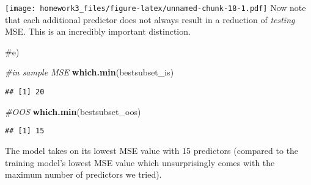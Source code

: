 \documentclass[
]{article}
\newenvironment{Shaded}{\begin{snugshade}}{\end{snugshade}}
\newcommand{\CommentTok}[1]{\textcolor[rgb]{0.56,0.35,0.01}{\textit{#1}}}
\newcommand{\KeywordTok}[1]{\textcolor[rgb]{0.13,0.29,0.53}{\textbf{#1}}}
\newcommand{\NormalTok}[1]{#1}
\begin{document}
\texttt{[image: homework3\_files/figure-latex/unnamed-chunk-18-1.pdf]}
Now note that each additional predictor does not always result in a
reduction of \emph{testing} MSE. This is an incredibly important
distinction.

\#e)

\begin{Shaded}
\begin{Highlighting}[]
\CommentTok{#in sample MSE}
\KeywordTok{which.min}\NormalTok{(bestsubset_is)}
\end{Highlighting}
\end{Shaded}

\begin{verbatim}
## [1] 20
\end{verbatim}

\begin{Shaded}
\begin{Highlighting}[]
\CommentTok{#OOS}
\KeywordTok{which.min}\NormalTok{(bestsubset_oos)}
\end{Highlighting}
\end{Shaded}

\begin{verbatim}
## [1] 15
\end{verbatim}

The model takes on its lowest MSE value with 15 predictors (compared to
the training model's lowest MSE value which unsurprisingly comes with
the maximum number of predictors we tried).
\end{document}

